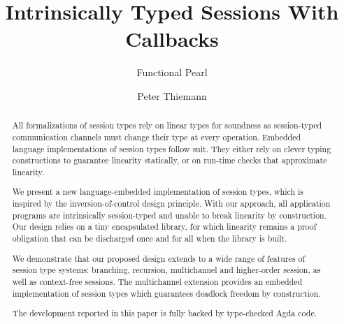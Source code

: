 \documentclass[acmsmall,review,anonymous,screen]{acmart}
\begin{document}
\title{Intrinsically Typed Sessions With Callbacks}
\subtitle{Functional Pearl}

\author{Peter Thiemann}


\begin{abstract}
All formalizations of session types rely on linear types for soundness as
session-typed communication channels must change their type at every
operation. Embedded language implementations of session types follow
suit. They either rely on clever typing constructions to guarantee
linearity statically, or on run-time checks that approximate
linearity.

We present a new language-embedded implementation of session types,
which is inspired by the inversion-of-control design principle. With
our approach, all application programs are intrinsically session-typed and
unable to break linearity by construction. Our design relies on a tiny
encapsulated library, for which linearity remains a proof
obligation that can be discharged once and for all when the library is built.

We demonstrate that our proposed design extends to a wide range of
features of session type systems: branching, recursion, multichannel
and higher-order session, as well as context-free sessions. The
multichannel extension provides an embedded implementation of
session types which guarantees deadlock freedom by construction.

The development reported in this paper is fully backed by
type-checked Agda code.
\end{abstract}
\end{document}

